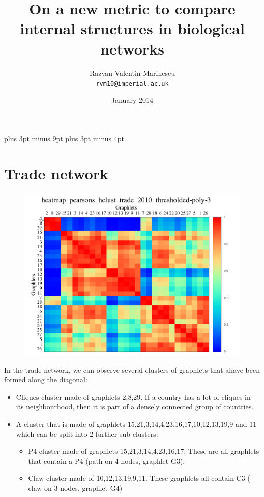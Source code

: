 \documentclass[11pt,a4paper,oneside]{report}
\title{On a new metric to compare internal structures in biological networks}
\date{January 2014}
\author{
  Razvan Valentin Marinescu\\
  \texttt{rvm10@imperial.ac.uk}
}
\begin{document}
\belowdisplayskip=12pt plus 3pt minus 9pt
\belowdisplayshortskip=7pt plus 3pt minus 4pt







\section*{Trade network}

\begin{figure}[H]
  \centering
\includegraphics[scale=0.4]
{../code/final_results/trade_2010_thresholded/heatmap_pearsons_hclust_trade_2010_thresholded-poly-3.png}
\caption{}
\label{fig:trade}
\end{figure}

In the trade network, we can observe several clusters of graphlets that ahave been formed along the diagonal:
\begin{itemize}
 \item Cliques cluster made of graphlets 2,8,29. If a country has a lot of cliques in its neighbourhood, then it is part of a densely connected group of countries. 
 \item A cluster that is made of graphlets 15,21,3,14,4,23,16,17,10,12,13,19,9 
 and 11 which can be split into 2 further sub-clusters: 
    \begin{itemize}
     \item P4 cluster made of graphlets 15,21,3,14,4,23,16,17. These are all 
     graphlets that contain a P4 (path on 4 nodes, graphlet G3). 
     \item Claw cluster made of 10,12,13,19,9,11. These graphlets all contain C3 ( claw on 3 nodes, graphlet G4)
    \end{itemize}
\end{itemize}
\end{document}
